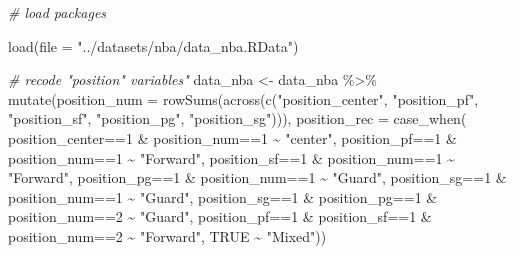 \documentclass[
]{book}
\newenvironment{Shaded}{\begin{snugshade}}{\end{snugshade}}
\newcommand{\AttributeTok}[1]{\textcolor[rgb]{0.77,0.63,0.00}{#1}}
\newcommand{\CommentTok}[1]{\textcolor[rgb]{0.56,0.35,0.01}{\textit{#1}}}
\newcommand{\ConstantTok}[1]{\textcolor[rgb]{0.00,0.00,0.00}{#1}}
\newcommand{\DecValTok}[1]{\textcolor[rgb]{0.00,0.00,0.81}{#1}}
\newcommand{\FunctionTok}[1]{\textcolor[rgb]{0.00,0.00,0.00}{#1}}
\newcommand{\NormalTok}[1]{#1}
\newcommand{\OtherTok}[1]{\textcolor[rgb]{0.56,0.35,0.01}{#1}}
\newcommand{\SpecialCharTok}[1]{\textcolor[rgb]{0.00,0.00,0.00}{#1}}
\newcommand{\StringTok}[1]{\textcolor[rgb]{0.31,0.60,0.02}{#1}}
\begin{document}
\begin{Shaded}
\begin{Highlighting}[]
\CommentTok{\# load packages}

\FunctionTok{load}\NormalTok{(}\AttributeTok{file =} \StringTok{"../datasets/nba/data\_nba.RData"}\NormalTok{)}



\CommentTok{\# recode "position" variables"}
\NormalTok{data\_nba }\OtherTok{\textless{}{-}}\NormalTok{ data\_nba }\SpecialCharTok{\%\textgreater{}\%}
  \FunctionTok{mutate}\NormalTok{(}\AttributeTok{position\_num =} \FunctionTok{rowSums}\NormalTok{(}\FunctionTok{across}\NormalTok{(}\FunctionTok{c}\NormalTok{(}\StringTok{"position\_center"}\NormalTok{, }\StringTok{"position\_pf"}\NormalTok{, }\StringTok{"position\_sf"}\NormalTok{,}
                                         \StringTok{"position\_pg"}\NormalTok{, }\StringTok{"position\_sg"}\NormalTok{))),}
         \AttributeTok{position\_rec =} 
           \FunctionTok{case\_when}\NormalTok{(}
\NormalTok{             position\_center}\SpecialCharTok{==}\DecValTok{1} \SpecialCharTok{\&}\NormalTok{ position\_num}\SpecialCharTok{==}\DecValTok{1} \SpecialCharTok{\textasciitilde{}} \StringTok{"center"}\NormalTok{,}
\NormalTok{             position\_pf}\SpecialCharTok{==}\DecValTok{1} \SpecialCharTok{\&}\NormalTok{ position\_num}\SpecialCharTok{==}\DecValTok{1} \SpecialCharTok{\textasciitilde{}} \StringTok{"Forward"}\NormalTok{,}
\NormalTok{             position\_sf}\SpecialCharTok{==}\DecValTok{1} \SpecialCharTok{\&}\NormalTok{ position\_num}\SpecialCharTok{==}\DecValTok{1} \SpecialCharTok{\textasciitilde{}} \StringTok{"Forward"}\NormalTok{,}
\NormalTok{             position\_pg}\SpecialCharTok{==}\DecValTok{1} \SpecialCharTok{\&}\NormalTok{ position\_num}\SpecialCharTok{==}\DecValTok{1} \SpecialCharTok{\textasciitilde{}} \StringTok{"Guard"}\NormalTok{,}
\NormalTok{             position\_sg}\SpecialCharTok{==}\DecValTok{1} \SpecialCharTok{\&}\NormalTok{ position\_num}\SpecialCharTok{==}\DecValTok{1} \SpecialCharTok{\textasciitilde{}} \StringTok{"Guard"}\NormalTok{,}
\NormalTok{             position\_sg}\SpecialCharTok{==}\DecValTok{1} \SpecialCharTok{\&}\NormalTok{ position\_pg}\SpecialCharTok{==}\DecValTok{1} \SpecialCharTok{\&}\NormalTok{ position\_num}\SpecialCharTok{==}\DecValTok{2} \SpecialCharTok{\textasciitilde{}} \StringTok{"Guard"}\NormalTok{,}
\NormalTok{             position\_pf}\SpecialCharTok{==}\DecValTok{1} \SpecialCharTok{\&}\NormalTok{ position\_sf}\SpecialCharTok{==}\DecValTok{1} \SpecialCharTok{\&}\NormalTok{ position\_num}\SpecialCharTok{==}\DecValTok{2} \SpecialCharTok{\textasciitilde{}} \StringTok{"Forward"}\NormalTok{,}
             \ConstantTok{TRUE} \SpecialCharTok{\textasciitilde{}} \StringTok{"Mixed"}\NormalTok{))}


\end{Highlighting}
\end{Shaded}
\end{document}
